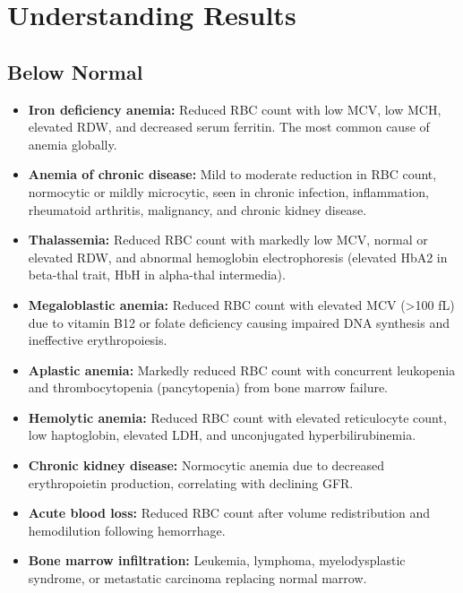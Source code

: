 \section*{Understanding Results}

\subsection*{Below Normal}
\begin{itemize}
  \item \textbf{Iron deficiency anemia:} Reduced RBC count with low MCV, low MCH, elevated RDW, and decreased serum ferritin. The most common cause of anemia globally.
  \item \textbf{Anemia of chronic disease:} Mild to moderate reduction in RBC count, normocytic or mildly microcytic, seen in chronic infection, inflammation, rheumatoid arthritis, malignancy, and chronic kidney disease.
  \item \textbf{Thalassemia:} Reduced RBC count with markedly low MCV, normal or elevated RDW, and abnormal hemoglobin electrophoresis (elevated HbA2 in beta-thal trait, HbH in alpha-thal intermedia).
  \item \textbf{Megaloblastic anemia:} Reduced RBC count with elevated MCV (>100 fL) due to vitamin B12 or folate deficiency causing impaired DNA synthesis and ineffective erythropoiesis.
  \item \textbf{Aplastic anemia:} Markedly reduced RBC count with concurrent leukopenia and thrombocytopenia (pancytopenia) from bone marrow failure.
  \item \textbf{Hemolytic anemia:} Reduced RBC count with elevated reticulocyte count, low haptoglobin, elevated LDH, and unconjugated hyperbilirubinemia.
  \item \textbf{Chronic kidney disease:} Normocytic anemia due to decreased erythropoietin production, correlating with declining GFR.
  \item \textbf{Acute blood loss:} Reduced RBC count after volume redistribution and hemodilution following hemorrhage.
  \item \textbf{Bone marrow infiltration:} Leukemia, lymphoma, myelodysplastic syndrome, or metastatic carcinoma replacing normal marrow.
\end{itemize}

